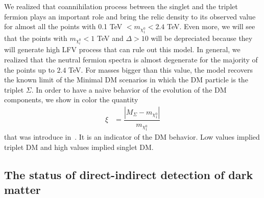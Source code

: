 \documentclass[12pt,letterpaper]{article}
\begin{document}
We realized that coannihilation process between the singlet and the triplet fermion plays an important role and bring the relic density to its observed value for almost all the points with 0.1 TeV $<m_{\chi_1^0}<2.4$ TeV. 
Even more, we will see that the points with  $m_{\chi_i^0}< 1$ TeV and $\Delta > 10$ will be depreciated because they will generate high LFV process that can rule out this model. 
In general, we realized that the neutral fermion spectra is almost degenerate for the majority of the points up to $2.4$ TeV. For masses bigger than this value, the model recovers the known limit of the Minimal DM scenarios in which the DM particle is the triplet $\Sigma$. 
In order to have a naive behavior of the evolution of the DM components, we show in color the quantity
\begin{align}
\label{eq:xi}
\xi &=\dfrac{|M_\Sigma - m_{\chi^0_1}|}{m_{\chi^0_1}}
\end{align}
that was introduce in~\cite{Hirsch:2013ola}. It is an indicator of the DM behavior. Low values implied triplet DM and high values implied singlet DM.



\subsection{The status of direct-indirect detection of dark matter }
\label{sec:indirect-direct-detection}
\end{document}
